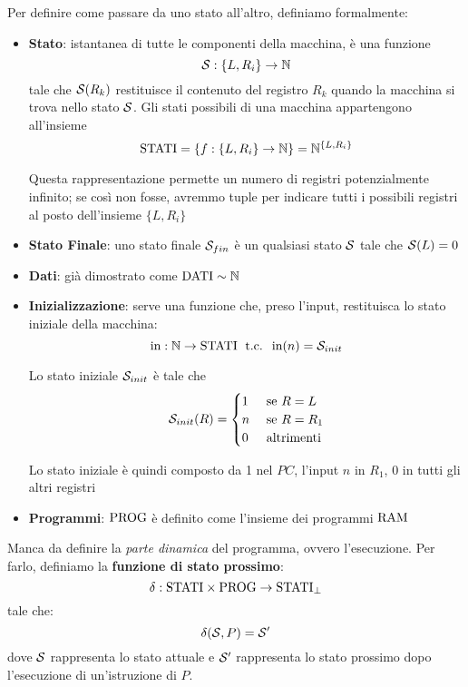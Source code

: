 Per definire come passare da uno stato all'altro, definiamo formalmente: 
\begin{itemize}
	\item \textbf{Stato}: istantanea di tutte le componenti della macchina, è una funzione 
	$$ \mathcal{S}: \{L, R_i\} \rightarrow \mathbb{N} $$
	tale che $\mathcal{S} (R_k)$ restituisce il contenuto del registro $R_k$ quando la macchina si trova nello stato $\mathcal{S}$. Gli stati possibili di una macchina appartengono all'insieme 
	$$ \text{STATI} = \{f: \{L, R_i\} \rightarrow \mathbb{N}\} = \mathbb{N}^{\{L,R_i\}} $$
	
    Questa rappresentazione permette un numero di registri potenzialmente infinito; se così non fosse, avremmo tuple per indicare tutti i possibili registri al posto dell'insieme $\{L,R_i\}$

	\item \textbf{Stato Finale}: uno stato finale $\mathcal{S}_{fin}$ è un qualsiasi stato $\mathcal{S}$ tale che $\mathcal{S} (L) = 0$
	
    \item \textbf{Dati}: già dimostrato come $\text{DATI} \sim \mathbb{N}$
	
    \item \textbf{Inizializzazione}: serve una funzione che, preso l'input, restituisca lo stato iniziale della macchina: 
	$$ \text{in}: \mathbb{N} \rightarrow \text{STATI} \; \text{ t.c. } \; \text{in}(n) = \mathcal{S}_{init}$$
    
	Lo stato iniziale $\mathcal{S}_{init}$ è tale che
	$$ 
	\mathcal{S}_{init} (R) = \begin{cases}
		1 & \text{ se } R=L \\
		n & \text{ se } R=R_1 \\
		0 & \text{ altrimenti}
	\end{cases}
	$$
    
    Lo stato iniziale è quindi composto da 1 nel $PC$, l'input $n$ in $R_1$, 0 in tutti gli altri registri
	
    \item \textbf{Programmi}: $\text{PROG}$ è definito come l'insieme dei programmi $\text{RAM}$
\end{itemize}

Manca da definire la \textit{parte dinamica} del programma, ovvero l'esecuzione. Per farlo, definiamo la \textbf{funzione di stato prossimo}: 
$$ \delta : \text{STATI} \times \text{PROG} \rightarrow \text{STATI}_\bot $$
tale che:
$$ \delta (\mathcal{S},P) = \mathcal{S}' $$
dove $\mathcal{S}$ rappresenta lo stato attuale e $\mathcal{S}'$ rappresenta lo stato prossimo dopo l'esecuzione di un'istruzione di $P$.

